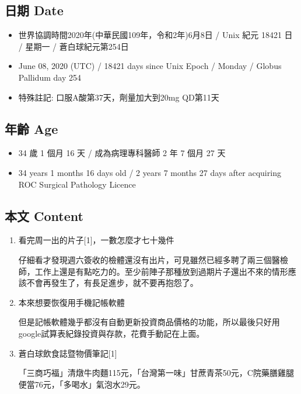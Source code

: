\documentclass[a5paper, 11pt
]{book}
\providecommand{\tightlist}{%
  \setlength{\itemsep}{0pt}\setlength{\parskip}{0pt}}
\begin{document}
\hypertarget{ux65e5ux671f-date-7}{%
\subsection{日期 Date}\label{ux65e5ux671f-date-7}}

\begin{itemize}
\tightlist
\item
  世界協調時間2020年(中華民國109年，令和2年)6月8日 / Unix 紀元 18421 日
  / 星期一 / 蒼白球紀元第254日
\item
  June 08, 2020 (UTC) / 18421 days since Unix Epoch / Monday / Globus
  Pallidum day 254
\item
  特殊註記: 口服A酸第37天，劑量加大到20mg QD第11天
\end{itemize}

\hypertarget{ux5e74ux9f61-age-7}{%
\subsection{年齡 Age}\label{ux5e74ux9f61-age-7}}

\begin{itemize}
\tightlist
\item
  34 歲 1 個月 16 天 / 成為病理專科醫師 2 年 7 個月 27 天
\item
  34 years 1 months 16 days old / 2 years 7 months 27 days after
  acquiring ROC Surgical Pathology Licence
\end{itemize}

\hypertarget{ux672cux6587-content-7}{%
\subsection{本文 Content}\label{ux672cux6587-content-7}}

\begin{enumerate}
\def\labelenumi{\arabic{enumi}.}
\item
  看完周一出的片子{[}1{]}，一數怎麼才七十幾件

  仔細看才發現週六簽收的檢體還沒有出片，可見雖然已經多聘了兩三個醫檢師，工作上還是有點吃力的。至少前陣子那種放到過期片子還出不來的情形應該不會再發生了，有長足進步，就不要再抱怨了。
\item
  本來想要恢復用手機記帳軟體

  但是記帳軟體幾乎都沒有自動更新投資商品價格的功能，所以最後只好用google試算表紀錄投資與存款，花費手動記在上面。
\item
  蒼白球飲食誌暨物價筆記{[}1{]}

  「三商巧福」清燉牛肉麵115元，「台灣第一味」甘蔗青茶50元，C院藥膳雞腿便當76元，「多喝水」氣泡水29元。
\end{enumerate}
\end{document}
